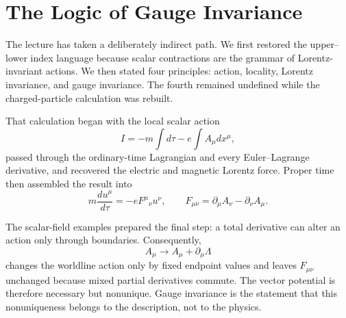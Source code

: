 \section{The Logic of Gauge Invariance}

The lecture has taken a deliberately indirect path.  We first restored the
upper--lower index language because scalar contractions are the grammar of
Lorentz-invariant actions.  We then stated four principles: action,
locality, Lorentz invariance, and gauge invariance.  The fourth remained
undefined while the charged-particle calculation was rebuilt.

That calculation began with the local scalar action
\begin{equation}
I
=
-m\int d\tau
-e\int A_\mu dx^\mu,
\end{equation}
passed through the ordinary-time Lagrangian and every Euler--Lagrange
derivative, and recovered the electric and magnetic Lorentz force.  Proper
time then assembled the result into
\begin{equation}
m\frac{du^\mu}{d\tau}
=
-eF^\mu{}_\nu u^\nu,
\qquad
F_{\mu\nu}
=
\partial_\mu A_\nu-\partial_\nu A_\mu.
\end{equation}

The scalar-field examples prepared the final step: a total derivative can
alter an action only through boundaries.  Consequently,
\begin{equation}
A_\mu\longrightarrow A_\mu+\partial_\mu\Lambda
\end{equation}
changes the worldline action only by fixed endpoint values and leaves
\(F_{\mu\nu}\) unchanged because mixed partial derivatives commute.  The
vector potential is therefore necessary but nonunique.  Gauge invariance is
the statement that this nonuniqueness belongs to the description, not to
the physics.
